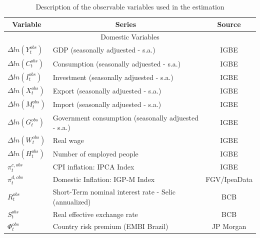 \documentclass[12pt,oneside,a4paper]{article}
\begin{document}
\begin{table}[H]
\centering
\caption{Description of the observable variables used in the estimation}
\label{table:base_dados}
\begin{tabular}{llc}
\hline
\multicolumn{1}{c}{Variable} & \multicolumn{1}{c}{Series}                              & Source        \\ \hline
\multicolumn{3}{c}{Domestic Variables}                                                                  \\ \hline
$\Delta ln(Y_t^{obs})$                              & GDP (seasonally adjuested - s.a.)                        & IGBE          \\ 
$\Delta ln(C_t^{obs})$                              & Consumption (seasonally adjuested - s.a.)                & IGBE          \\ 
$\Delta ln(I_t^{obs})$                              & Investment (seasonally adjuested - s.a.)                 & IGBE          \\ 
$\Delta ln(X_t^{obs})$                              & Export (seasonally adjuested - s.a.)                     & IGBE          \\ 
$\Delta ln(M_t^{obs})$                              & Import (seasonally adjuested - s.a.)                     & IGBE          \\ 
$\Delta ln(G_t^{obs})$                              & Government consumption (seasonally adjuested - s.a.)     & IGBE          \\ 
$\Delta ln(W_t^{obs})$                              & Real wage                                                & IGBE          \\ 
$\Delta ln(H_t^{obs})$                              & Number of employed people                                & IGBE          \\ 
$\pi_t^{c, obs}$                            & CPI inflation: IPCA Index                                & IGBE          \\ 
$\pi_t^{d, obs}$                            & Domestic Inflation: IGP-M Index                          & FGV/IpeaData           \\ 
$R_t^{obs}$                              & Short-Term nominal interest rate - Selic (annualized)    & BCB           \\ 
$S_t^{obs}$                              & Real effective exchange rate                             & BCB           \\ 
$\Phi_t^{obs}$                            & Country risk premium (EMBI Brazil)                       & JP Morgan     \\ \hline

\end{tabular}
\end{table}
\end{document}
